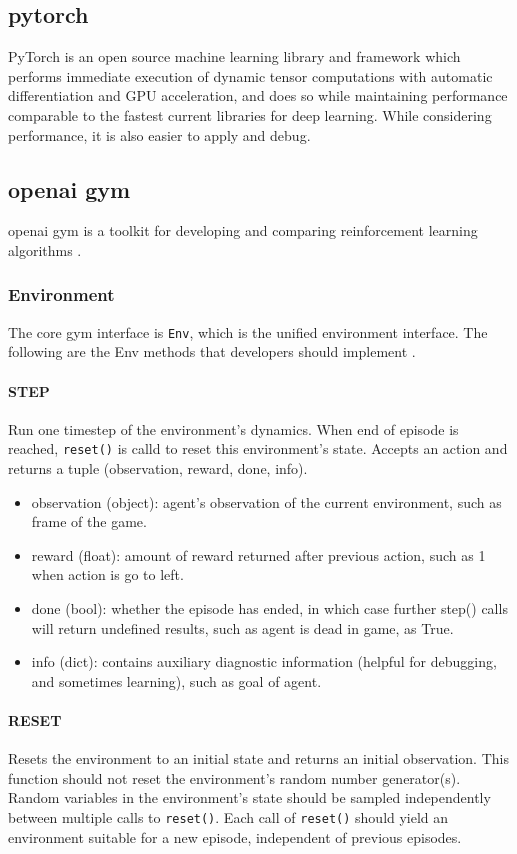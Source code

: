 \subsection{\gls{pytorch}} PyTorch is an open source machine learning library and framework which performs immediate execution of dynamic tensor computations with automatic differentiation and GPU acceleration, and does so while maintaining performance comparable to the fastest current libraries for deep learning\parencite{NEURIPS2019_bdbca288}. While considering performance, it is also easier to apply and debug.

\subsection{\gls{openai gym}}
\gls{openai gym} is a toolkit for developing and comparing reinforcement learning algorithms \parencite{brockman2016openai}.
\subsubsection{Environment}
The core gym interface is \texttt{Env}, which is the unified environment interface. The following are the Env methods that developers should implement \parencite{brockman2016openai}.

\paragraph{STEP} Run one timestep of the environment's dynamics. When end of episode is reached, \texttt{reset()} is calld to reset this environment's state. Accepts an action and returns a tuple (observation, reward, done, info).
\begin{itemize}
\item observation (object): agent's observation of the current environment, such as frame of the game.
\item reward (float): amount of reward returned after previous action, such as 1 when action is go to left.
\item done (bool): whether the episode has ended, in which case further step() calls will return undefined results, such as agent is dead in game, as True.
\item info (dict): contains auxiliary diagnostic information (helpful for debugging, and sometimes learning), such as goal of agent.
\end{itemize}

\paragraph{RESET} Resets the environment to an initial state and returns an initial observation. This function should not reset the environment's random number generator(s). Random variables in the environment's state should be sampled independently between multiple calls to \texttt{reset()}. Each call of \texttt{reset()} should yield an environment suitable for a new episode, independent of previous episodes.
